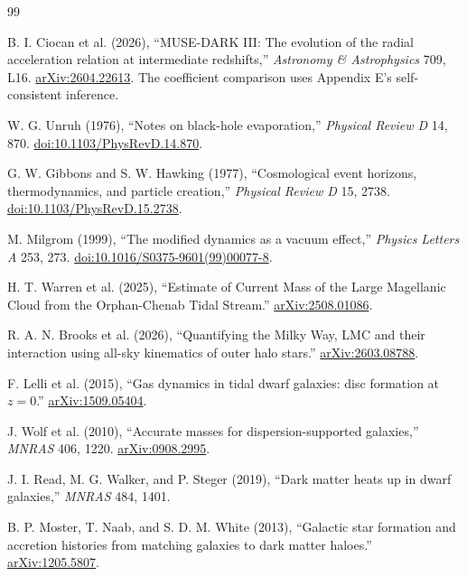 \begin{thebibliography}{99}
\small
\setlength{\itemsep}{3pt}
\setlength{\parskip}{0pt}

 B. I. Ciocan et al. (2026),
``MUSE-DARK III: The evolution of the radial acceleration relation at
intermediate redshifts,'' \emph{Astronomy \& Astrophysics} 709, L16.
\href{https://arxiv.org/abs/2604.22613}{arXiv:2604.22613}.
The coefficient comparison uses Appendix E's self-consistent inference.

 W. G. Unruh (1976), ``Notes on black-hole evaporation,''
\emph{Physical Review D} 14, 870.
\href{https://doi.org/10.1103/PhysRevD.14.870}{doi:10.1103/PhysRevD.14.870}.

 G. W. Gibbons and S. W. Hawking (1977),
``Cosmological event horizons, thermodynamics, and particle creation,''
\emph{Physical Review D} 15, 2738.
\href{https://doi.org/10.1103/PhysRevD.15.2738}{doi:10.1103/PhysRevD.15.2738}.

 M. Milgrom (1999), ``The modified dynamics as a vacuum effect,''
\emph{Physics Letters A} 253, 273.
\href{https://doi.org/10.1016/S0375-9601(99)00077-8}{doi:10.1016/S0375-9601(99)00077-8}.

 H. T. Warren et al. (2025), ``Estimate of Current Mass
of the Large Magellanic Cloud from the Orphan-Chenab Tidal Stream.''
\href{https://arxiv.org/abs/2508.01086}{arXiv:2508.01086}.

 R. A. N. Brooks et al. (2026), ``Quantifying the
Milky Way, LMC and their interaction using all-sky kinematics of outer
halo stars.'' \href{https://arxiv.org/abs/2603.08788}{arXiv:2603.08788}.

 F. Lelli et al. (2015), ``Gas dynamics in tidal dwarf
galaxies: disc formation at $z=0$.''
\href{https://arxiv.org/abs/1509.05404}{arXiv:1509.05404}.

 J. Wolf et al. (2010), ``Accurate masses for
dispersion-supported galaxies,'' \emph{MNRAS} 406, 1220.
\href{https://arxiv.org/abs/0908.2995}{arXiv:0908.2995}.

 J. I. Read, M. G. Walker, and P. Steger (2019), ``Dark
matter heats up in dwarf galaxies,'' \emph{MNRAS} 484, 1401.

 B. P. Moster, T. Naab, and S. D. M. White (2013),
``Galactic star formation and accretion histories from matching galaxies
to dark matter haloes.''
\href{https://arxiv.org/abs/1205.5807}{arXiv:1205.5807}.


\end{thebibliography}
